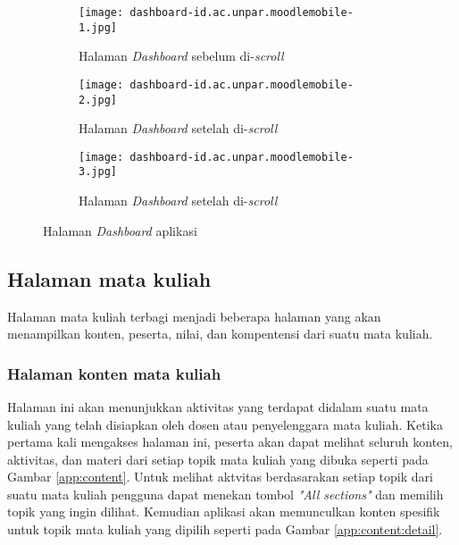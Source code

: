 \begin{figure}[H]
	\centering  
	\begin{subfigure}[ht]{.3\textwidth}
	\centering
	\texttt{[image: dashboard-id.ac.unpar.moodlemobile-1.jpg]} 
	\caption{Halaman \textit{Dashboard} sebelum di-\textit{scroll}}
	\end{subfigure}
	\hfill
	\begin{subfigure}[ht]{.3\textwidth}
	\centering
	\texttt{[image: dashboard-id.ac.unpar.moodlemobile-2.jpg]} 
	\caption{Halaman \textit{Dashboard} setelah di-\textit{scroll}}
	\end{subfigure}
	\hfill
	\begin{subfigure}[ht]{.3\textwidth}
	\centering
	\texttt{[image: dashboard-id.ac.unpar.moodlemobile-3.jpg]} 
	\caption{Halaman \textit{Dashboard} setelah di-\textit{scroll}}
	\end{subfigure}

	\caption[Halaman \textit{Dashboard} aplikasi] {Halaman \textit{Dashboard} aplikasi} 
	\label{app:dashboard} 
\end{figure}  

\subsection{Halaman mata kuliah}

Halaman mata kuliah terbagi menjadi beberapa halaman yang akan menampilkan konten, peserta, nilai, dan kompentensi dari suatu mata kuliah. 

\subsubsection{Halaman konten mata kuliah}

Halaman ini akan menunjukkan aktivitas yang terdapat didalam suatu mata kuliah yang telah disiapkan oleh dosen atau penyelenggara mata kuliah. Ketika pertama kali mengakses halaman ini, peserta akan dapat melihat seluruh konten, aktivitas, dan materi dari setiap topik mata kuliah yang dibuka seperti pada Gambar \ref{app:content}. Untuk melihat aktvitas berdasarakan setiap topik dari suatu mata kuliah pengguna dapat menekan tombol \textit{"All sections"} dan memilih topik yang ingin dilihat. Kemudian aplikasi akan memunculkan konten spesifik untuk topik mata kuliah yang dipilih seperti pada Gambar \ref{app:content:detail}.

